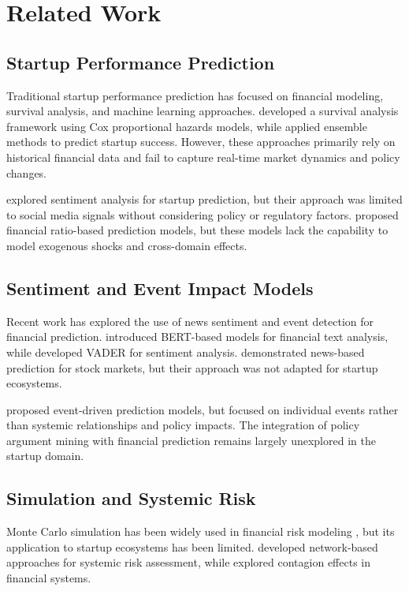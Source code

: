 \documentclass[conference]{IEEEtran}
\begin{document}
\section{Related Work}

\subsection{Startup Performance Prediction}

Traditional startup performance prediction has focused on financial modeling, survival analysis, and machine learning approaches. \cite{zhang2020startup} developed a survival analysis framework using Cox proportional hazards models, while \cite{kim2019ml} applied ensemble methods to predict startup success. However, these approaches primarily rely on historical financial data and fail to capture real-time market dynamics and policy changes.

\cite{wang2021sentiment} explored sentiment analysis for startup prediction, but their approach was limited to social media signals without considering policy or regulatory factors. \cite{liu2022financial} proposed financial ratio-based prediction models, but these models lack the capability to model exogenous shocks and cross-domain effects.

\subsection{Sentiment and Event Impact Models}

Recent work has explored the use of news sentiment and event detection for financial prediction. \cite{devlin2019bert} introduced BERT-based models for financial text analysis, while \cite{hutto2014vader} developed VADER for sentiment analysis. \cite{zhang2021news} demonstrated news-based prediction for stock markets, but their approach was not adapted for startup ecosystems.

\cite{chen2020event} proposed event-driven prediction models, but focused on individual events rather than systemic relationships and policy impacts. The integration of policy argument mining with financial prediction remains largely unexplored in the startup domain.

\subsection{Simulation and Systemic Risk}

Monte Carlo simulation has been widely used in financial risk modeling \cite{glasserman2013monte}, but its application to startup ecosystems has been limited. \cite{cont2010network} developed network-based approaches for systemic risk assessment, while \cite{acharya2017systemic} explored contagion effects in financial systems.
\end{document}
